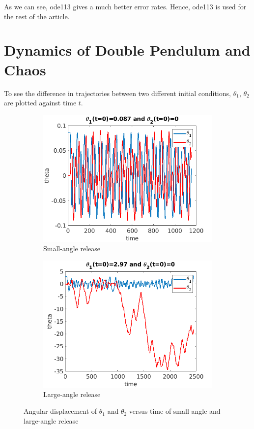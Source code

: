 \documentclass{article}
\begin{document}
As we can see, ode113 gives a much better error rates. Hence, ode113 is used for the rest of the article.




\section{Dynamics of Double Pendulum and Chaos}

To see the difference in trajectories between two different initial conditions, $\theta_1$, $\theta_2$ are plotted against time $t$.

\begin{figure}[!htbp]
  \begin{subfigure}[b]{0.5\textwidth}
    \includegraphics[width=\textwidth]{smallAngle.png}
    \caption{Small-angle release}
    \label{fig:f1}
  \end{subfigure}
  \hfill
  \begin{subfigure}[b]{0.5\textwidth}
    \includegraphics[width=\textwidth]{largeAngle.png}
    \caption{Large-angle release}
    \label{fig:f2}
  \end{subfigure}
  \caption{Angular displacement of $\theta_1$ and $\theta_2$ versus time of small-angle and large-angle release}
\end{figure}
\end{document}

